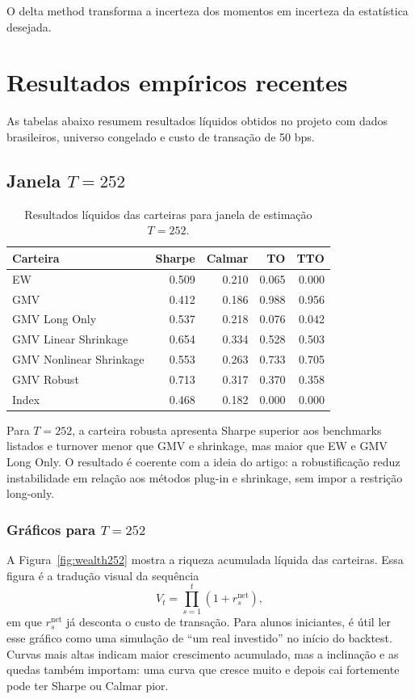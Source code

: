 \documentclass[12pt,a4paper]{article}
\begin{document}
O delta method transforma a incerteza dos momentos em incerteza da estatística desejada.

\section{Resultados empíricos recentes}

As tabelas abaixo resumem resultados líquidos obtidos no projeto com dados brasileiros,
universo congelado e custo de transação de 50 bps.

\subsection{\texorpdfstring{Janela $T=252$}{Janela T=252}}

\begin{table}[htbp]
\centering
\caption{Resultados líquidos das carteiras para janela de estimação $T=252$.}
\label{tab:resultados-252}
\begin{tabular}{lrrrr}
\toprule
Carteira & Sharpe & Calmar & TO & TTO \\
\midrule
EW & 0.509 & 0.210 & 0.065 & 0.000 \\
GMV & 0.412 & 0.186 & 0.988 & 0.956 \\
GMV Long Only & 0.537 & 0.218 & 0.076 & 0.042 \\
GMV Linear Shrinkage & 0.654 & 0.334 & 0.528 & 0.503 \\
GMV Nonlinear Shrinkage & 0.553 & 0.263 & 0.733 & 0.705 \\
GMV Robust & 0.713 & 0.317 & 0.370 & 0.358 \\
Index & 0.468 & 0.182 & 0.000 & 0.000 \\
\bottomrule
\end{tabular}
\end{table}

Para $T=252$, a carteira robusta apresenta Sharpe superior aos benchmarks listados e turnover
menor que GMV e shrinkage, mas maior que EW e GMV Long Only. O resultado é coerente com a
ideia do artigo: a robustificação reduz instabilidade em relação aos métodos plug-in e
shrinkage, sem impor a restrição long-only.

\subsubsection{Gráficos para \texorpdfstring{$T=252$}{T=252}}

A Figura~\ref{fig:wealth252} mostra a riqueza acumulada líquida das carteiras. Essa figura
é a tradução visual da sequência
\[
  V_t = \prod_{s=1}^{t}(1+r^{\mathrm{net}}_s),
\]
em que $r^{\mathrm{net}}_s$ já desconta o custo de transação. Para alunos iniciantes, é útil
ler esse gráfico como uma simulação de ``um real investido'' no início do backtest. Curvas
mais altas indicam maior crescimento acumulado, mas a inclinação e as quedas também importam:
uma curva que cresce muito e depois cai fortemente pode ter Sharpe ou Calmar pior.
\end{document}

